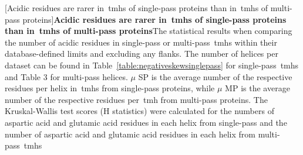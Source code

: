 \begin{table}[htbp]

  \centering
  [Acidic residues are rarer in~\gls{tmh}s of single-pass proteins than in~\gls{tmh}s of multi-pass proteins]{\textbf{Acidic residues are rarer in~\gls{tmh}s of single-pass proteins than in~\gls{tmh}s of multi-pass proteins}The statistical results when comparing the number of acidic residues in single-pass or multi-pass~\gls{tmh}s within their database-defined limits and excluding any flanks.
  The number of helices per dataset can be found in Table~\ref{table:negativeskewsinglepass} for single-pass~\gls{tmh}s and Table 3 for multi-pass helices.
  $\mu$ SP is the average number of the respective residues per helix in~\gls{tmh}s from single-pass proteins, while $\mu$ MP is the average number of the respective residues per~\gls{tmh} from multi-pass proteins.
  The Kruskal-Wallis test scores (H statistics) were calculated for the numbers of aspartic acid and glutamic acid residues in each helix from single-pass and the number of aspartic acid and glutamic acid residues in each helix from multi-pass~\gls{tmh}s}


\end{table}
